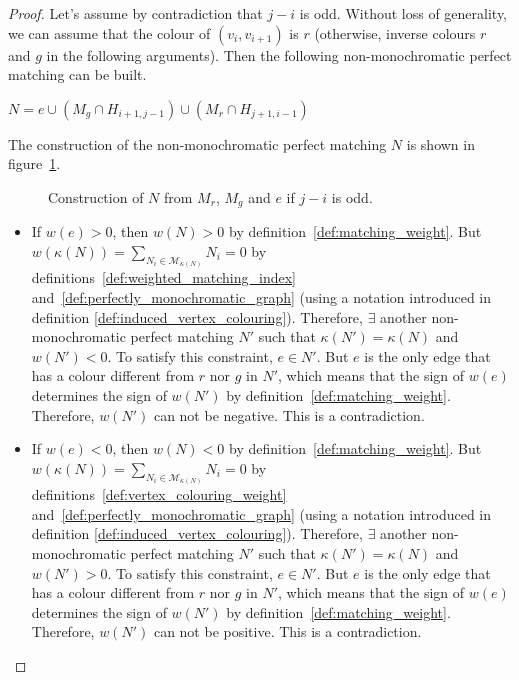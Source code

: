 \begin{proof}
    Let's assume by contradiction that $j-i$ is odd.
    Without loss of generality, we can assume that the colour of $(v_i, v_{i+1})$ is $r$ (otherwise, inverse colours $r$ and $g$ in the following arguments).
    Then the following non-monochromatic perfect matching can be built.

    \begin{center}
        $N = e \cup (M_g \cap H_{i+1, j-1}) \cup (M_r \cap H_{j+1, i-1})$
    \end{center}

    The construction of the non-monochromatic perfect matching $N$ is shown in figure~\ref{fig:2_pos_classes_odd_crossings}.

    \begin{figure}[H]   %
        \caption{Construction of $N$ from $M_r$, $M_g$ and $e$ if $j-i$ is odd.}
        \label{fig:2_pos_classes_odd_crossings}
    \end{figure}

    \begin{itemize}
        \item If $w(e) > 0$, then $w(N) > 0$ by definition~\ref{def:matching_weight}.
        But $w(\kappa(N)) = \sum\limits_{N_i \in \mathcal{M}_{\kappa(N)}} N_i = 0$ by definitions~\ref{def:weighted_matching_index} and~\ref{def:perfectly_monochromatic_graph} (using a notation introduced in definition \ref{def:induced_vertex_colouring}).
        Therefore, $\exists$ another non-monochromatic perfect matching $N'$ such that $\kappa(N') = \kappa(N)$ and $w(N') < 0$.
        To satisfy this constraint, $e \in N'$.
        But $e$ is the only edge that has a colour different from $r$ nor $g$ in $N'$, which means that the sign of $w(e)$ determines the sign of $w(N')$ by definition~\ref{def:matching_weight}.
        Therefore, $w(N')$ can not be negative.
        This is a contradiction.

        \item If $w(e) < 0$, then $w(N) < 0$ by definition~\ref{def:matching_weight}.
        But $w(\kappa(N)) = \sum\limits_{N_i \in \mathcal{M}_{\kappa(N)}} N_i = 0$ by definitions~\ref{def:vertex_colouring_weight} and~\ref{def:perfectly_monochromatic_graph} (using a notation introduced in definition \ref{def:induced_vertex_colouring}).
        Therefore, $\exists$ another non-monochromatic perfect matching $N'$ such that $\kappa(N') = \kappa(N)$ and $w(N') > 0$.
        To satisfy this constraint, $e \in N'$.
        But $e$ is the only edge that has a colour different from $r$ nor $g$ in $N'$, which means that the sign of $w(e)$ determines the sign of $w(N')$ by definition~\ref{def:matching_weight}.
        Therefore, $w(N')$ can not be positive.
        This is a contradiction.

    \end{itemize}
\end{proof}

